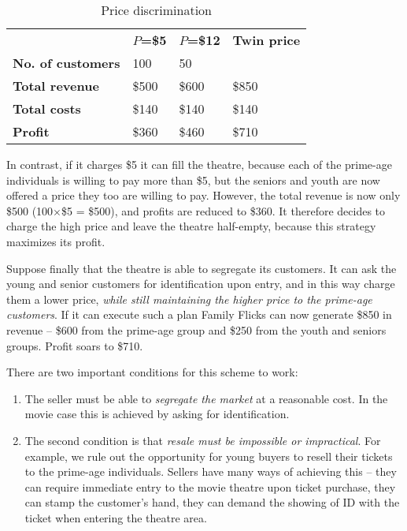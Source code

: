\begin{table}[H]
\begin{center}
\begin{tabu} to 30em {|X[3,c]X[1,c]X[1,c]X[1,c]|} \hline 
{}	& \textbf{$P$=\$5}	& \textbf{$P$=\$12} & \textbf{Twin price} \\
\textbf{No. of customers}		& 100	& 50	&	\\
	\textbf{Total revenue}	& \$500	& \$600 & \$850	\\ 
\textbf{Total costs}	& \$140				& \$140 			& \$140	\\
	\textbf{Profit}		& \$360		& \$460 & \$710	\\ \hline 
\end{tabu}
\end{center}
\caption{Price discrimination \label{table:pricediscrimination}} 
\end{table}

In contrast, if it charges \$5 it can fill the theatre, because each of the prime-age individuals is willing to pay more than \$5, but the seniors and youth are now offered a price they too are willing to pay.  However, the total revenue is now only \$500 (100$\times$\$5 = \$500), and profits are reduced to \$360.  It therefore decides to charge the high price and leave the theatre half-empty, because this strategy maximizes its profit.

Suppose finally that the theatre is able to segregate its customers. It can ask the young and senior customers for identification upon entry, and in this way charge them a lower price, \textit{while still maintaining the higher price to the prime-age customers}. If it can execute such a plan Family Flicks can now generate \$850 in revenue -- \$600 from the prime-age group and \$250 from the youth and seniors groups. Profit soars to \$710.

There are two important conditions for this scheme to work:

\begin{enumerate}
\item The seller must be able to \textit{segregate the market} at a reasonable cost. In the movie case this is achieved by asking for identification. 

\item The second condition is that \textit{resale must be impossible or impractical}. For example, we rule out the opportunity for young buyers to resell their tickets to the prime-age individuals. Sellers have many ways of achieving this -- they can require immediate entry to the movie theatre upon ticket purchase, they can stamp the customer's hand, they can demand the showing of ID with the ticket when entering the theatre area.
\end{enumerate}

